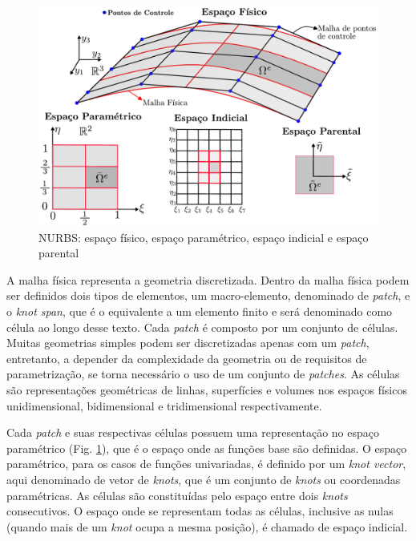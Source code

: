 \documentclass[tese_patricia]{subfiles}
\begin{document}
\begin{figure}[htb!]
	\centering 
	\includegraphics[scale=0.7,trim=0cm 0cm 0cm 0cm, clip=true]{Imagens/Cap3/espacos_NURBS.pdf}	
	\caption{NURBS: espaço físico, espaço paramétrico, espaço indicial e espaço parental}
	\label{fig:espacos_NURBS}
\end{figure}


A malha física representa a geometria discretizada. Dentro da malha física podem ser definidos dois tipos de elementos, um macro-elemento, denominado de \textit{patch}, e o \textit{knot span}, que é o equivalente a um elemento finito e será denominado como célula ao longo desse texto. Cada \textit{patch} é composto por um conjunto de células. Muitas geometrias simples podem ser discretizadas apenas com um \textit{patch}, entretanto, a depender da complexidade da geometria ou de requisitos de parametrização, se torna necessário o uso de um conjunto de \textit{patches}. As células são representações geométricas de linhas, superfícies e volumes nos espaços físicos unidimensional, bidimensional e tridimensional respectivamente.

Cada \textit{patch} e suas respectivas células possuem uma representação no espaço paramétrico (Fig. \ref{fig:espacos_NURBS}), que é o espaço onde as funções base são definidas. O espaço paramétrico, para os casos de funções univariadas, é definido por um \textit{knot vector}, aqui denominado de vetor de \textit{knots}, que é um conjunto de \textit{knots} ou coordenadas paramétricas. As células são constituídas pelo espaço entre dois \textit{knots} consecutivos. O espaço onde se representam todas as células, inclusive as nulas (quando mais de um \textit{knot} ocupa a mesma posição), é chamado de espaço indicial.
\end{document}
